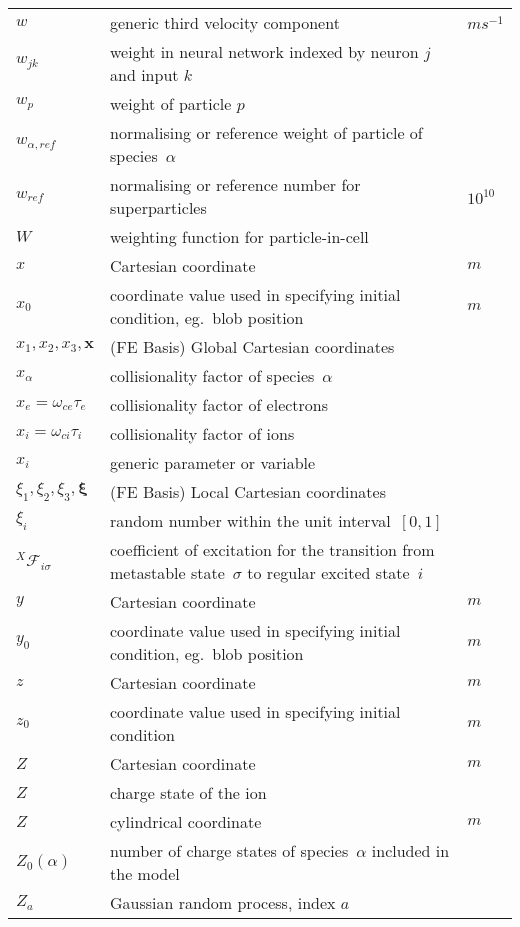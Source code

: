 \begin{longtable}{|p{3.0cm}|p{10.0cm}|p{3.0cm}|}
$w$ & generic third velocity component  & $m s^{-1}$ \\
$w_{jk}$ & weight in neural network indexed by neuron $j$ and input $k$  & \\
$w_p$ & weight of particle $p$ & \\
$w_{\alpha,ref}$ & normalising or reference weight of particle of species~$\alpha$ & \\
$w_{ref} $ & normalising or reference number for superparticles & $10^{10}$  \\
$W$ & weighting function for particle-in-cell & \\
$x$ & Cartesian coordinate  & $m$ \\
$x_0$ & coordinate value used in specifying initial condition, eg.\ blob position & $m$ \\
$x_1, x_2, x_3, {\mathbf x}$ &  (FE Basis) Global Cartesian coordinates & \\
$x_\alpha$ & collisionality factor of species~$\alpha$ & \\
$x_e = \omega_{ce}\tau_e$ & collisionality factor of electrons & \\
$x_i = \omega_{ci}\tau_i$ & collisionality factor of ions & \\
$x_i$ & generic parameter or variable  & \\ 
$\xi_1, \xi_2, \xi_3, \boldsymbol{\xi}$ &  (FE Basis) Local Cartesian coordinates & \\
$\xi_i$ & random number within the unit interval~$[0,1]$  & \\
$^X\mathcal{F}_{i\sigma}$ & coefficient of excitation for the transition from metastable state~$\sigma$ to regular excited state~$i$  & \\
$y$ & Cartesian coordinate  & $m$ \\
$y_0$ & coordinate value used in specifying initial condition, eg.\ blob position & $m$ \\
$z$ & Cartesian coordinate  & $m$ \\
$z_0$ & coordinate value used in specifying initial condition & $m$ \\
$Z$ & Cartesian coordinate  & $m$ \\
$Z$ & charge state of the ion & \\
$Z$ & cylindrical coordinate  & $m$ \\
$Z_0(\alpha)$ & number of charge states of species~$\alpha$ included in the model & \\
$Z_a$ & Gaussian random process, index $a$  & \\

\end{longtable}
